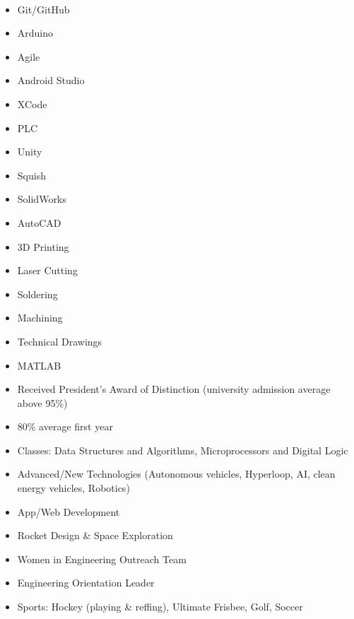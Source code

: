 \\
\begin{multicols}{2}
    \begin{itemize}
    	\item Git/GitHub
      	\item Arduino
      	\item Agile
      	\item Android Studio
      	\item XCode
		\item PLC
      	\item Unity
      	\item Squish
      	\item SolidWorks
      	\item AutoCAD
      	\item 3D Printing
      	\item Laser Cutting
      	\item Soldering
      	\item Machining
      	\item Technical Drawings
      	\item MATLAB
    \end{itemize}
\end{multicols}
\medskip

\begin{itemize}
\item Received President's Award of Distinction (university admission average above 95\%)
\item 80\%\+ average first year
\item Classes: Data Structures and Algorithms, Microprocessors and Digital Logic
\end{itemize}
\bigskip

\begin{itemize}
\item Advanced/New Technologies (Autonomous vehicles, Hyperloop, AI, clean energy vehicles, Robotics)
\item App/Web Development
\item Rocket Design \& Space Exploration
\item Women in Engineering Outreach Team
\item Engineering Orientation Leader
\item Sports: Hockey (playing \& reffing), Ultimate Frisbee, Golf, Soccer
\end{itemize}